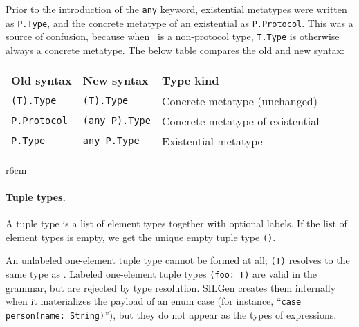 \documentclass[../generics]{subfiles}
\begin{document}
Prior to the introduction of the \texttt{any} keyword, existential metatypes were written as \texttt{P.Type}, and the concrete metatype of an existential as \texttt{P.Protocol}. This was a source of confusion, because when \tT\ is a non-protocol type, \texttt{T.Type} is otherwise always a concrete metatype. The below table compares the old and new syntax:
\begin{center}
\begin{tabular}{lll}
\toprule
\textbf{Old syntax}&\textbf{New syntax}&\textbf{Type kind}\\
\midrule
\texttt{(T).Type}&\texttt{(T).Type}&Concrete metatype (unchanged)\\
\texttt{P.Protocol}&\texttt{(any P).Type}&Concrete metatype of existential\\
\texttt{P.Type}&\texttt{any P.Type}&Existential metatype\\
\bottomrule
\end{tabular}
\end{center}

\begin{wrapfigure}[12]{r}{6cm}
\begin{center}
\end{center}
\end{wrapfigure}

\paragraph{Tuple types.}
A tuple type is a list of element types together with optional labels. If the list of element types is empty, we get the unique empty tuple type \texttt{()}.

An unlabeled one-element tuple type cannot be formed at all; \texttt{(T)} resolves to the same type as \tT. Labeled one-element tuple types \texttt{(foo:\ T)} are valid in the grammar, but are rejected by type resolution. SILGen creates them internally when it materializes the payload of an enum case (for instance, ``\texttt{case person(name:\ String)}''), but they do not appear as the types of expressions.
\end{document}
